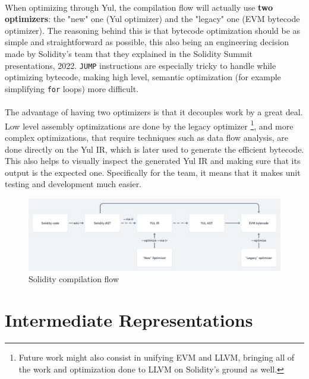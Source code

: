 \paragraph*{}
When optimizing through Yul, the compilation flow will actually use \textbf{two optimizers}: the "new" one (Yul optimizer) and the "legacy" one (EVM bytecode optimizer). The reasoning behind this is that bytecode optimization should be as simple and straightforward as possible, this also being an engineering decision made by Solidity's team that they explained in the Solidity Summit presentations, 2022. \lstinline[columns=fixed]{JUMP} instructions are especially tricky to handle while optimizing bytecode, making high level, semantic optimization (for example simplifying \lstinline[columns=fixed]{for} loops) more difficult.

\paragraph*{}
The advantage of having two optimizers is that it decouples work by a great deal. Low level assembly optimizations are done by the legacy optimizer \footnote{Future work might also consist in unifying EVM and LLVM, bringing all of the work and optimization done to LLVM on Solidity's ground as well.}, and more complex optimizations, that require techniques such as data flow analysis, are done directly on the Yul IR, which is later used to generate the efficient bytecode. This also helps to visually inspect the generated Yul IR and making sure that its output is the expected one. Specifically for the team, it means that it makes unit testing and development much easier.

\begin{figure}
    \centering
    \includegraphics[width=15cm]{images/solc_flow.png}
    \caption{Solidity compilation flow}
    \label{fig:solc-compilation-flow}
\end{figure}

\section{Intermediate Representations}

